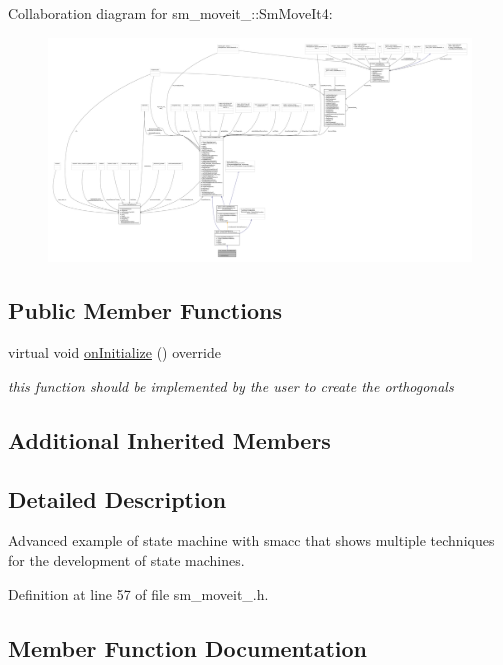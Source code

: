 Collaboration diagram for sm\+\_\+moveit\+\_\+:\+:Sm\+Move\+It4\+:
\nopagebreak
\begin{figure}[H]
\begin{center}
\leavevmode
\includegraphics[width=350pt]{structsm__moveit__4_1_1SmMoveIt4__coll__graph}
\end{center}
\end{figure}
\subsection*{Public Member Functions}
\begin{DoxyCompactItemize}
\item 
virtual void \hyperlink{structsm__moveit__4_1_1SmMoveIt4_a6a8149ada7bb62f89ccc514ad7408f15}{on\+Initialize} () override
\begin{DoxyCompactList}\small\item\em this function should be implemented by the user to create the orthogonals \end{DoxyCompactList}\end{DoxyCompactItemize}
\subsection*{Additional Inherited Members}


\subsection{Detailed Description}
Advanced example of state machine with smacc that shows multiple techniques for the development of state machines. 

Definition at line 57 of file sm\+\_\+moveit\+\_.\+h.



\subsection{Member Function Documentation}
\mbox{\label{structsm__moveit__4_1_1SmMoveIt4_a6a8149ada7bb62f89ccc514ad7408f15}} 
